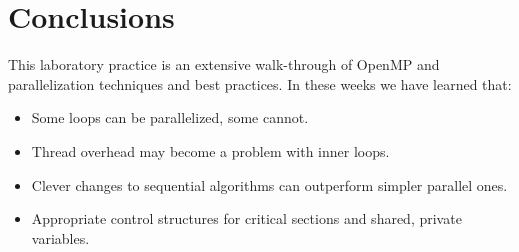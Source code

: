 \documentclass[a4paper]{article}
\begin{document}
\section{Conclusions}
This laboratory practice is an extensive walk-through of OpenMP and parallelization techniques and best practices. In these weeks we have learned that:
\begin{itemize}
    \item Some loops can be parallelized, some cannot.
    \item Thread overhead may become a problem with inner loops.
    \item Clever changes to sequential algorithms can outperform simpler parallel ones.
    \item Appropriate control structures for critical sections and shared, private variables.
\end{itemize}
\end{document}
